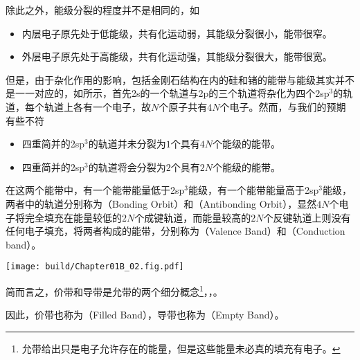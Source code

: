 除此之外，能级分裂的程度并不是相同的，如
\begin{itemize}
    \item 内层电子原先处于低能级，共有化运动弱，其能级分裂很小，能带很窄。
    \item 外层电子原先处于高能级，共有化运动强，其能级分裂很大，能带很宽。
\end{itemize}

但是，由于杂化作用的影响，包括金刚石结构在内的硅和锗的能带与能级其实并不是一一对应的，如所示，首先2s的一个轨道与2p的三个轨道将杂化为四个2sp$^3$的轨道，每个轨道上各有一个电子，故$N$个原子共有$4N$个电子。然而，与我们的预期有些不符
\begin{itemize}
    \item 四重简并的2sp$^3$的轨道并未分裂为$1$个具有$4N$个能级的能带。
    \item 四重简并的2sp$^3$的轨道将会分裂为$2$个具有$2N$个能级的能带。
\end{itemize}
在这两个能带中，有一个能带能量低于2sp$^3$能级，有一个能带能量高于2sp$^3$能级，两者中的轨道分别称为（Bonding Orbit）和（Antibonding Orbit），显然$4N$个电子将完全填充在能量较低的$2N$个成键轨道，而能量较高的$2N$个反键轨道上则没有任何电子填充，将两者构成的能带，分别称为（Valence Band）和（Conduction band）。\cite{W2}

\begin{Figure}[能级分裂与能带]
    \texttt{[image: build/Chapter01B\_02.fig.pdf]}
\end{Figure}

简而言之，价带和导带是允带的两个细分概念\footnote{允带给出只是电子允许存在的能量，但是这些能量未必真的填充有电子。}，，。

因此，价带也称为（Filled Band），导带也称为（Empty Band）。
